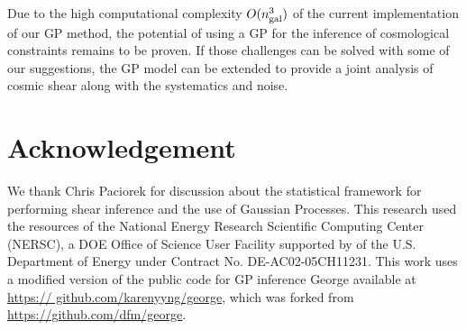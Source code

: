 Due to the high computational complexity $O(n_{\rm gal}^3)$ of the current
implementation of our GP method,  
the potential of using a GP for the inference of cosmological
constraints remains to be proven.
If those challenges can be solved with some of our
suggestions, the GP model can be 
extended to provide a joint analysis of cosmic shear along with 
the systematics and noise. 







\section{Acknowledgement}
We thank Chris Paciorek for discussion about the statistical
framework for performing shear inference and the
use of Gaussian Processes.
This research
used the resources of the National Energy Research Scientific 
Computing Center (NERSC), a DOE Office of Science
User Facility supported by 
of the U.S. Department of Energy under Contract No.
DE-AC02-05CH11231.
 This work uses a modified version
of the public code for GP inference {\sc George} available at \href{https://
github.com/karenyyng/george}{https://
github.com/karenyyng/george}, which was forked from \\
\href{https://github.com/dfm/george}{https://github.com/dfm/george}.



